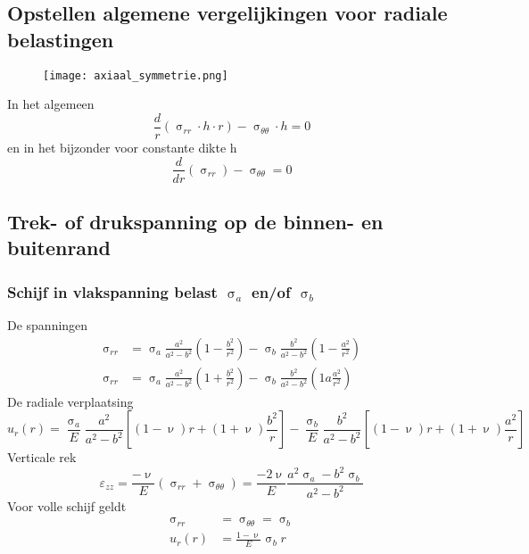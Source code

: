         \subsection{Opstellen algemene vergelijkingen voor radiale belastingen}

            \begin{figure}[h!]
                \centering
                \texttt{[image: axiaal\_symmetrie.png]}
            \end{figure}
            In het algemeen
            \begin{equation}
                \frac{d}{r}(\upsigma_{rr}\cdot h\cdot r) - \upsigma_{\theta\theta}\cdot h = 0
            \end{equation}
            en in het bijzonder voor constante dikte h
            \begin{equation}
                \frac{d}{dr}(\upsigma_{rr}) - \upsigma_{\theta\theta} = 0
            \end{equation}
        
        \subsection{Trek- of drukspanning op de binnen- en buitenrand}
            
            \subsubsection{Schijf in vlakspanning belast $\upsigma_{a}$ en/of $\upsigma_{b}$}
                
                De spanningen
                \begin{align}
                    \upsigma_{rr} &= \upsigma_a\frac{a^2}{a^2-b^2}\left(1-\frac{b^2}{r^2}\right)-\upsigma_b\frac{b^2}{a^2-b^2}\left(1-\frac{a^2}{r^2}\right)\nonumber\\
                    \upsigma_{rr} &= \upsigma_a\frac{a^2}{a^2-b^2}\left(1+\frac{b^2}{r^2}\right)-\upsigma_b\frac{b^2}{a^2-b^2}\left(1a\frac{a^2}{r^2}\right)
                \end{align}
                De radiale verplaatsing
                \begin{equation}
                    u_r(r) = \frac{\upsigma_a}{E}\frac{a^2}{a^2-b^2}\left[(1-\upnu)r+(1+\upnu)\frac{b^2}{r}\right] -\frac{\upsigma_b}{E}\frac{b^2}{a^2-b^2}\left[(1-\upnu)r+(1+\upnu)\frac{a^2}{r}\right]
                \end{equation}
                Verticale rek
                \begin{equation}
                    \varepsilon_{zz} = \frac{-\upnu}{E}(\upsigma_{rr}+\upsigma_{\theta\theta})=\frac{-2\upnu}{E}\frac{a^2\upsigma_a-b^2\upsigma_b}{a^2-b^2}
                \end{equation}
                Voor volle schijf geldt
                \begin{align}
                    \upsigma_{rr} &= \upsigma_{\theta\theta} = \upsigma_b\nonumber\\
                    u_r(r) &= \frac{1-\upnu}{E}\upsigma_b r
                \end{align}

